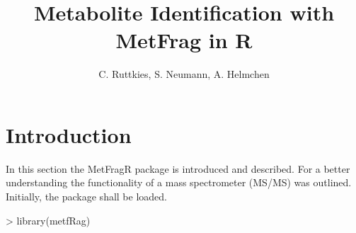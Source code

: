 \documentclass[12pt, a4paper]{scrartcl}
\begin{document}
%
\title{Metabolite Identification with MetFrag in R}
\author{C. Ruttkies, S. Neumann, A. Helmchen}
\maketitle

\newpage
\tableofcontents

\newpage
\section{Introduction}
In this section the MetFragR package is introduced and described.
For a better understanding the functionality of a mass spectrometer (MS/MS) was outlined. 
Initially, the package shall be loaded.

\begin{Schunk}
\begin{Sinput}
> library(metfRag)
\end{Sinput}
\end{Schunk}
\end{document}
